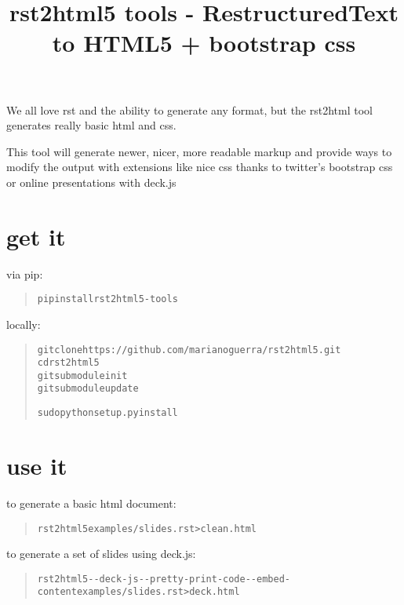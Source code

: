 \documentclass[a4paper]{article}
\begin{document}
\title{rst2html5 tools - RestructuredText to HTML5 + bootstrap css%
  \label{rst2html5-tools-restructuredtext-to-html5-bootstrap-css}}
\author{}
\date{}
\maketitle

We all love rst and the ability to generate any format, but the rst2html tool generates really basic html and css.

This tool will generate newer, nicer, more readable markup and provide ways to modify the output with extensions like nice css
thanks to twitter's bootstrap css or online presentations with deck.js


\section{get it%
  \label{get-it}%
}

via pip:

\begin{quote}
\begin{alltt}
pip install rst2html5-tools
\end{alltt}
\end{quote}

locally:

\begin{quote}
\begin{alltt}
git clone https://github.com/marianoguerra/rst2html5.git
cd rst2html5
git submodule init
git submodule update

sudo python setup.py install
\end{alltt}
\end{quote}


\section{use it%
  \label{use-it}%
}

to generate a basic html document:

\begin{quote}
\begin{alltt}
rst2html5 examples/slides.rst > clean.html
\end{alltt}
\end{quote}

to generate a set of slides using deck.js:

\begin{quote}
\begin{alltt}
rst2html5 -{}-deck-js -{}-pretty-print-code -{}-embed-content examples/slides.rst > deck.html
\end{alltt}
\end{quote}
\end{document}

